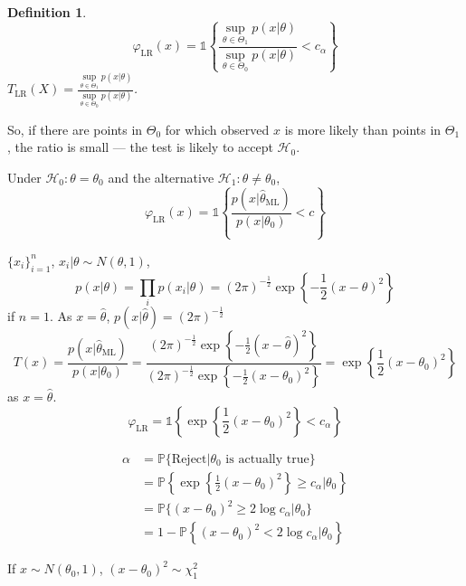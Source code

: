 \documentclass{article}
\newtheorem{definition}{Definition}
\begin{document}
\begin{definition}
  \[ \varphi_{\text{LR}} (x) = \mathbb{1} \left\{ \frac{\underset{\theta \in
     \Theta_1}{\sup} p (x | \theta)}{\underset{\theta \in
     \Theta_0}{\sup} p (x | \theta)} < c_{\alpha} \right\} \]
  $T_{\text{LR}} (X) = \frac{\underset{\theta \in \Theta_1}{\sup} p (x |
  \theta)}{\underset{\theta \in \Theta_0}{\sup} p (x | \theta)}$.
\end{definition}

So, if there are points in $\Theta_0$ for which observed $x$ is more likely
than points in $\Theta_1$, the ratio is small --- the test is likely to accept
$\mathcal{H}_0$.

Under $\mathcal{H}_0 : \theta = \theta_0$ and the alternative $\mathcal{H}_1 :
\theta \neq \theta_0$,
\[ \varphi_{\text{LR}} (x) = \mathbb{1} \left\{ \frac{p (x |
   \hat{\theta}_{\text{ML}})}{p (x | \theta_0)} < c \right\} \]

\begin{example}
  $\{ x_i \}_{i = 1}^n$, $x_i | \theta \sim N (\theta, 1)$,
  \[ p (x | \theta) = \prod_i p (x_i | \theta) = (2
     \pi)^{- \frac{1}{2}} \exp \left\{ - \frac{1}{2} (x - \theta)^2 \right\}
  \]
  if $n = 1$. As $x = \hat{\theta}$, $p (x | \hat{\theta}) = (2
  \pi)^{- \frac{1}{2}}$
  \[ T (x) = \frac{p (x | \hat{\theta}_{\text{ML}})}{p (x |
     \theta_0)} = \frac{(2 \pi)^{- \frac{1}{2}} \exp \left\{ -
     \frac{1}{2} (x - \hat{\theta})^2 \right\}}{(2 \pi)^{- \frac{1}{2}} \exp
     \left\{ - \frac{1}{2} (x - \theta_0)^2 \right\}} = \exp \left\{
     \frac{1}{2} (x - \theta_0)^2 \right\} \]
  as $x = \hat{\theta}$.
  \[ \varphi_{\text{LR}} = \mathbb{1} \left\{ \exp \left\{ \frac{1}{2} (x -
     \theta_0)^2 \right\} < c_{\alpha} \right\} \]
\end{example}

\begin{align*}
  \alpha & = \mathbb{P} \{ \text{Reject} | \theta_0 \text{ is}
  \text{ actually true} \}\\
  & = \mathbb{P} \left\{ \exp \left\{ \frac{1}{2} (x - \theta_0)^2 \right\}
  \geq c_{\alpha} | \theta_0 \right\}\\
  & = \mathbb{P} \{ (x - \theta_0)^2 \geq 2 \log c_{\alpha} |
  \theta_0 \}\\
  & = 1 - \mathbb{P} \left\{ (x - \theta_0)^2 <
  2 \log c_{\alpha} | \theta_0 \right\}
\end{align*}

If $x \sim N (\theta_0, 1)$, $(x - \theta_0)^2 \sim \chi_{1}^2$
\end{document}
